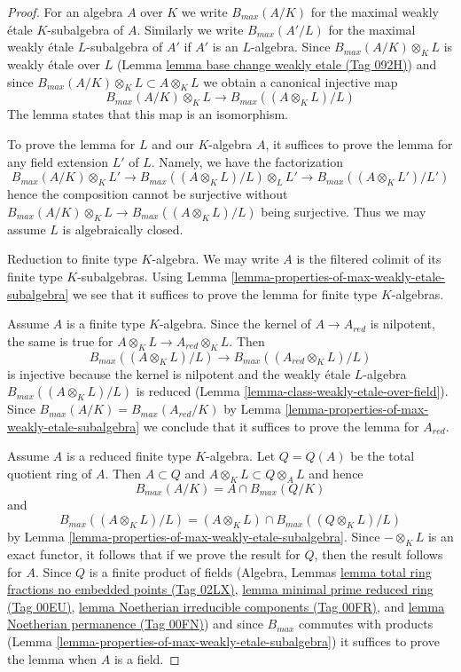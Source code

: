 \documentclass{amsart}
\theoremstyle{plain}
\theoremstyle{definition}
\theoremstyle{remark}
\numberwithin{equation}{subsection}
\begin{document}
\begin{proof}
For an algebra $A$ over $K$ we write $B_{max}(A/K)$
for the maximal weakly \'etale $K$-subalgebra of $A$.
Similarly we write $B_{max}(A'/L)$ for the maximal weakly \'etale
$L$-subalgebra of $A'$ if $A'$ is an $L$-algebra.
Since $B_{max}(A/K) \otimes_K L$ is weakly \'etale over $L$
(Lemma \href{https://stacks.math.columbia.edu/tag/092H}{lemma base change weakly etale (Tag 092H)})
and since $B_{max}(A/K) \otimes_K L \subset A \otimes_K L$
we obtain a canonical injective map
$$
B_{max}(A/K) \otimes_K L \to B_{max}((A \otimes_K L)/L)
$$
The lemma states that this map is an isomorphism.

\medskip\noindent
To prove the lemma for $L$ and our $K$-algebra $A$, it suffices to
prove the lemma for any field extension $L'$ of $L$. Namely, we have
the factorization
$$
B_{max}(A/K) \otimes_K L' \to
B_{max}((A \otimes_K L)/L) \otimes_L L' \to
B_{max}((A \otimes_K L')/L')
$$
hence the composition cannot be surjective without
$B_{max}(A/K) \otimes_K L \to B_{max}((A \otimes_K L)/L)$
being surjective. Thus we may assume $L$ is algebraically closed.

\medskip\noindent
Reduction to finite type $K$-algebra. We may write $A$
is the filtered colimit of its finite type $K$-subalgebras.
Using Lemma \ref{lemma-properties-of-max-weakly-etale-subalgebra}
we see that it suffices to prove the lemma for finite type
$K$-algebras.

\medskip\noindent
Assume $A$ is a finite type $K$-algebra. Since the kernel
of $A \to A_{red}$ is nilpotent, the same is true for
$A \otimes_K L \to A_{red} \otimes_K L$. Then
$$
B_{max}((A \otimes_K L)/L) \to B_{max}((A_{red} \otimes_K L)/L)
$$
is injective because the kernel is nilpotent and the
weakly \'etale $L$-algebra $B_{max}((A \otimes_K L)/L)$ is reduced
(Lemma \ref{lemma-class-weakly-etale-over-field}).
Since $B_{max}(A/K) = B_{max}(A_{red}/K)$
by Lemma \ref{lemma-properties-of-max-weakly-etale-subalgebra}
we conclude
that it suffices to prove the lemma for $A_{red}$.

\medskip\noindent
Assume $A$ is a reduced finite type $K$-algebra.
Let $Q = Q(A)$ be the total quotient ring of $A$.
Then $A \subset Q$ and $A \otimes_K L \subset Q \otimes_A L$
and hence
$$
B_{max}(A/K) = A \cap B_{max}(Q/K)
$$
and
$$
B_{max}((A \otimes_K L)/L) =
(A \otimes_K L) \cap B_{max}((Q \otimes_K L)/L)
$$
by Lemma \ref{lemma-properties-of-max-weakly-etale-subalgebra}.
Since $-\otimes_K L$ is an exact functor, it follows that
if we prove the result for $Q$, then the result follows for $A$.
Since $Q$ is a finite product of fields (Algebra, Lemmas
\href{https://stacks.math.columbia.edu/tag/02LX}{lemma total ring fractions no embedded points (Tag 02LX)},
\href{https://stacks.math.columbia.edu/tag/00EU}{lemma minimal prime reduced ring (Tag 00EU)},
\href{https://stacks.math.columbia.edu/tag/00FR}{lemma Noetherian irreducible components (Tag 00FR)}, and
\href{https://stacks.math.columbia.edu/tag/00FN}{lemma Noetherian permanence (Tag 00FN)})
and since $B_{max}$ commutes with products
(Lemma \ref{lemma-properties-of-max-weakly-etale-subalgebra})
it suffices to prove the lemma when $A$ is a field.


\end{proof}
\end{document}
